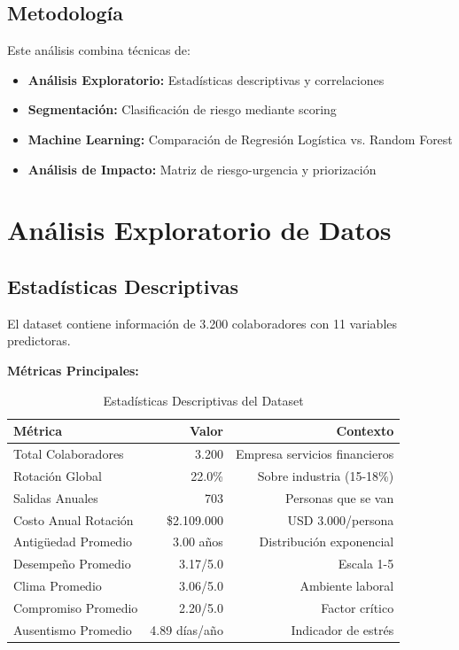 \documentclass[11pt,a4paper,twoside]{article}
\begin{document}
\subsection{Metodología}

Este análisis combina técnicas de:

\begin{itemize}
    \item \textbf{Análisis Exploratorio:} Estadísticas descriptivas y correlaciones
    \item \textbf{Segmentación:} Clasificación de riesgo mediante scoring
    \item \textbf{Machine Learning:} Comparación de Regresión Logística vs. Random Forest
    \item \textbf{Análisis de Impacto:} Matriz de riesgo-urgencia y priorización
\end{itemize}

\newpage

\section{Análisis Exploratorio de Datos}

\subsection{Estadísticas Descriptivas}

El dataset contiene información de 3.200 colaboradores con 11 variables predictoras.

\textbf{Métricas Principales:}

\begin{table}[H]
    \centering
    \caption{Estadísticas Descriptivas del Dataset}
    \begin{tabular}{|l|r|r|}
        \toprule
        \textbf{Métrica} & \textbf{Valor} & \textbf{Contexto} \\
        \midrule
        Total Colaboradores & 3.200 & Empresa servicios financieros \\
        Rotación Global & 22.0\% & Sobre industria (15-18\%) \\
        Salidas Anuales & 703 & Personas que se van \\
        Costo Anual Rotación & \$2.109.000 & USD 3.000/persona \\
        \midrule
        Antigüedad Promedio & 3.00 años & Distribución exponencial \\
        Desempeño Promedio & 3.17/5.0 & Escala 1-5 \\
        Clima Promedio & 3.06/5.0 & Ambiente laboral \\
        Compromiso Promedio & 2.20/5.0 & Factor crítico \\
        Ausentismo Promedio & 4.89 días/año & Indicador de estrés \\
        \bottomrule
    \end{tabular}
\end{table}
\end{document}
